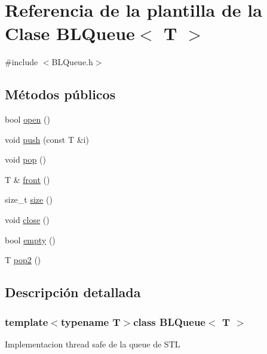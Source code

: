 \hypertarget{classBLQueue}{\section{\-Referencia de la plantilla de la \-Clase \-B\-L\-Queue$<$ \-T $>$}
\label{classBLQueue}
}


{\ttfamily \#include $<$\-B\-L\-Queue.\-h$>$}

\subsection*{\-Métodos públicos}
\begin{DoxyCompactItemize}
\item 
bool \hyperlink{classBLQueue_aa4fbbd7e78c74ba3e27b9e146c0809c5}{open} ()
\item 
void \hyperlink{classBLQueue_a01c2553ef17dae5f8a93c31d0dbc5e5b}{push} (const \-T \&i)
\item 
void \hyperlink{classBLQueue_a743ac414b28a72da5559c821c1cb8a6d}{pop} ()
\item 
\-T \& \hyperlink{classBLQueue_a315a89c6149fda3acb47b8fa06eeba24}{front} ()
\item 
size\-\_\-t \hyperlink{classBLQueue_a1b21e1fee3e1db6f5219717db52d75fb}{size} ()
\item 
void \hyperlink{classBLQueue_a5da301e76e6e806bfa2f5ccd381b8765}{close} ()
\item 
bool \hyperlink{classBLQueue_a2520867dfcb8410f9444a627ccdc33a5}{empty} ()
\item 
\-T \hyperlink{classBLQueue_a256da323a063b77f3828a02cfc8fb9d8}{pop2} ()
\end{DoxyCompactItemize}


\subsection{\-Descripción detallada}
\subsubsection*{template$<$typename \-T$>$class B\-L\-Queue$<$ T $>$}

\-Implementacion thread safe de la queue de \-S\-T\-L 

